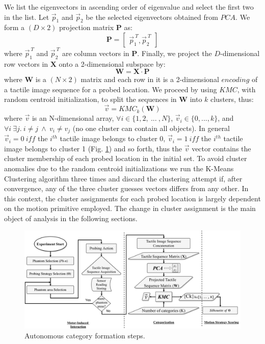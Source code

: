 \documentclass[]{interact}
\theoremstyle{plain}%
\theoremstyle{definition}
\theoremstyle{remark}
\begin{document}
We list the eigenvectors in ascending order of eigenvalue and select the first two in the list. Let $\vec{p}_1$ and $\vec{p}_2$ be the selected eigenvectors obtained from $PCA$. We form a $(D\times 2)$ projection matrix $\mathbf{P}$ as:
\begin{equation}
\mathbf{P}=\begin{bmatrix}\vec{p}_1^{\ T}, \vec{p}_2^{\ T}\end{bmatrix}	
\end{equation}
where $\vec{p}_1^{\ T}$ and $\vec{p}_2^{\ T}$ are column vectors in $\mathbf{P}$. Finally, we project the $D$-dimensional row vectors in $\mathbf{X}$ onto a 2-dimensional subspace by:
\begin{equation}
\mathbf{W}=\mathbf{X}\cdot \mathbf{P}
\end{equation}
where $\mathbf{W}$ is a $(N\times 2)$ matrix and each row in it is a 2-dimensional $encoding$ of a tactile image sequence for a probed location. We proceed by using $KMC$, with random centroid initialization, to split the sequences in $\mathbf{W}$ into $k$ clusters, thus:
\begin{equation}
\vec{v} = KMC_{k}(\mathbf{W})
\end{equation}
where $\vec{v}$ is an N-dimensional array, $\forall i\in \{1, 2,\ ...\ , N\}$,   $\vec{v}_i\in\{0, ..., k\}$, and $\forall i\ \exists j.\ i\neq j\ \land\ v_i\neq v_j$ (no one cluster can contain all objects). In general $\vec{v}_i=0\ iff$ the $i^{th}$ tactile image belongs to cluster 0, $\vec{v}_i=1\ iff$ the $i^{th}$ tactile image belongs to cluster 1 (Fig. \ref{self_org_processing}) and so forth, thus the $\vec{v}$ vector contains the cluster membership of each probed location in the initial set. To avoid cluster anomalies due to the random centroid initializations we run the K-Means Clustering algorithm three times and discard the clustering attempt if, after convergence, any of the three cluster guesses vectors differs from any other. In this context, the cluster assignments for each probed location is largely dependent on the motion primitive employed. The change in cluster assignment is the main object of analysis in the following sections.
 \begin{figure}[]
 	\centering
 	\includegraphics[width=.9\textwidth]{./figs/motion_primitive_preprocessing.pdf}
 	\caption{Autonomous category formation steps.} %
 	\label{self_org_processing}
 \end{figure}
\end{document}
